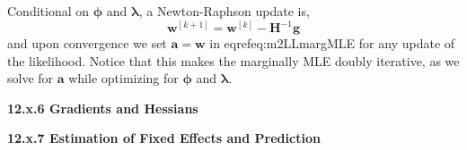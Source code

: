 \documentclass[12pt, titlepage]{article}
\begin{document}
Conditional on $\boldsymbol{\phi}$ and $\boldsymbol{\lambda}$, a Newton-Raphson update is,
\[
\mathbf{w}^{[k+1]} = \mathbf{w}^{[k]} - \mathbf{H}^{-1}\mathbf{g}
\]
and upon convergence we set $\mathbf{a} = \mathbf{w}$ in eqref{eq:m2LLmargMLE} for any update of the likelihood.  Notice that this makes the marginally MLE doubly iterative, as we solve for $\mathbf{a}$ while optimizing for $\boldsymbol{\phi}$ and $\boldsymbol{\lambda}$.




\vspace{.5cm}
{\large \flushleft \textbf{12.x.6 Gradients and Hessians}}
\vspace{.5cm}



\vspace{.5cm}
{\large \flushleft \textbf{12.x.7 Estimation of Fixed Effects and Prediction}}
\vspace{.5cm}
\end{document}
